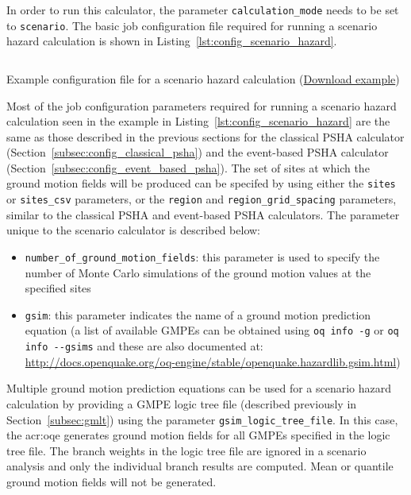 In order to run this calculator, the parameter \Verb+calculation_mode+ needs
to be set to \Verb+scenario+. The basic job configuration file required for
running a scenario hazard calculation is shown in
Listing~\ref{lst:config_scenario_hazard}.

\begin{listing}[htbp]
  \inputminted[firstline=1,firstnumber=1,fontsize=\footnotesize,frame=single,linenos,bgcolor=lightgray,label=job.ini]{ini}{oqum/hazard/verbatim/config_scenario.ini}
  \caption{Example configuration file for a scenario hazard calculation (\href{https://raw.githubusercontent.com/gem/oq-engine/master/oqum/hazard/verbatim/config_scenario.ini}{Download example})}
  \label{lst:config_scenario_hazard}
\end{listing}

Most of the job configuration parameters required for running a scenario
hazard calculation seen in the example in
Listing~\ref{lst:config_scenario_hazard} are the same as those described in
the previous sections for the classical PSHA calculator
(Section~\ref{subsec:config_classical_psha}) and the event-based PSHA
calculator (Section~\ref{subsec:config_event_based_psha}). The set of sites at
which the ground motion fields will be produced can be specifed by using
either the \Verb+sites+ or \Verb+sites_csv+ parameters, or the \Verb+region+
and \Verb+region_grid_spacing+  parameters, similar to the classical PSHA and
event-based PSHA calculators. The parameter unique to the scenario calculator
is described below:

\begin{itemize}

  \item \Verb+number_of_ground_motion_fields+: this parameter is used to
    specify the number of Monte Carlo simulations of the ground motion
    values at the specified sites

  \item \Verb+gsim+: this parameter indicates the name of a ground motion
  prediction equation (a list of available GMPEs can be obtained using
  \texttt{oq info -g} or \texttt{oq info -{}-gsims} and these are also
  documented at: \href{http://docs.openquake.org/oq-engine/stable/openquake.hazardlib.gsim.html}{http://docs.openquake.org/oq-engine/stable/openquake.hazardlib.gsim.html})

\end{itemize}

Multiple ground motion prediction equations can be used for a scenario hazard
calculation by providing a GMPE logic tree file (described previously in 
Section~\ref{subsec:gmlt}) using the parameter \Verb+gsim_logic_tree_file+.
In this case, the \glsdesc{acr:oqe} generates ground motion fields
for all GMPEs specified in the logic tree file. The branch weights in the logic
tree file are ignored in a scenario analysis and only the individual branch
results are computed. Mean or quantile ground motion fields will not be 
generated.


